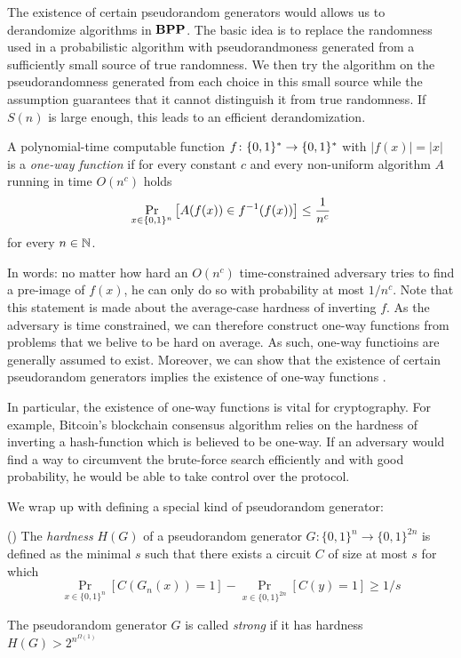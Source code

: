 \documentclass[11pt]{article}
\begin{document}
The existence of certain pseudorandom generators would allows us to
derandomize algorithms in $\mathbf{BPP}$. The basic idea is to replace the randomness
used in a probabilistic algorithm with pseudorandmoness generated from a
sufficiently small source of true randomness. We then try the algorithm on the
pseudorandomness generated from each choice in this small source while the
assumption guarantees that it cannot distinguish it from true randomness.
If $S(n)$ is large enough, this leads to an efficient derandomization.

\begin{definition}
  A polynomial-time computable
  function $f \colon \{0,1\}^* \to \{0,1\}^*$ with 
  $|f(x)| = |x|$
  is a \emph{one-way function}
  if for every constant $c$ and every non-uniform algorithm $A$ running in
  time $O(n^c)$ holds
  \[
    \Pr_{x \in \{0,1\}^n}\left[A(f(x)) \in f^{-1}(f(x))\right] \le \frac 1 {n^c}
  \]
  for every $n \in {\mathbb{N}}$.
\end{definition}

In words: no matter how hard an $O(n^c)$ time-constrained adversary tries to
find a pre-image of $f(x)$, he can only do so with probability at most
$1 / n^c$.
Note that this statement is made about the average-case hardness of inverting
$f$. As the adversary is time constrained, we can therefore construct one-way
functions from problems that we belive to be hard on average.
%
As such, one-way functioins are generally assumed to exist.
Moreover, we can show that the existence of certain pseudorandom generators
implies the existence of one-way functions \cite{hastad99}.
%

In particular,
the existence of one-way functions is vital for cryptography. For example,
Bitcoin's blockchain consensus algorithm relies on the hardness of inverting
a hash-function which is believed to be one-way.
If an adversary would find a way to circumvent the brute-force search
efficiently and with good probability, he would be able to take control over
the protocol.
%

We wrap up with defining a special kind of pseudorandom generator:

\begin{definition}(\cite{10.1145/335305.335314})
	The \textit{hardness} $H(G)$ of a pseudorandom generator $G: \{0, 1\}^n \rightarrow \{0, 1\}^{2n}$ is defined as the minimal $s$ such that there exists a circuit $C$ of size at most $s$ for which
	\[\Pr_{x \in \{0, 1\}^n}[C(G_n(x)) = 1] - \Pr_{x \in \{0, 1\}^{2n}}[C(y) = 1] \geq 1/s\]
	
	The pseudorandom generator $G$ is called \textit{strong} if it has hardness $H(G) > 2^{n^{\Omega(1)}}$ 
\end{definition}
\end{document}
